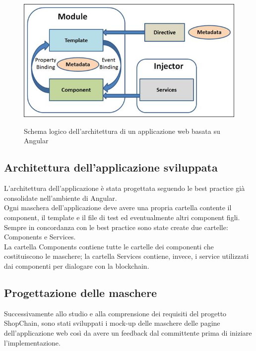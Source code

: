 \begin{figure}[!h] 
    \centering 
    \includegraphics[width=0.8\columnwidth]{immagini/AngularArchitecture.jpg} 
    \caption{Schema logico dell'architettura di un applicazione web basata su Angular}\cite{site:angular-architecture}
\end{figure}

\subsection{Architettura dell'applicazione sviluppata}
L’architettura dell’applicazione è stata progettata seguendo le best practice già consolidate nell’ambiente di Angular.\\
Ogni maschera dell’applicazione deve avere una propria cartella contente il component, il template e il file di test ed eventualmente altri component figli.\\
Sempre in concordanza con le best practice sono state create due cartelle: Components e Services.\\
La cartella Components contiene tutte le cartelle dei componenti che costituiscono le maschere; la cartella Services contiene, invece, i service utilizzati dai componenti per dialogare con la blockchain.


\subsection{Progettazione delle maschere}

Successivamente allo studio e alla comprensione dei requisiti del progetto ShopChain, sono stati sviluppati i mock-up delle maschere delle pagine dell'applicazione web così da avere un feedback dal committente prima di iniziare l'implementazione.

